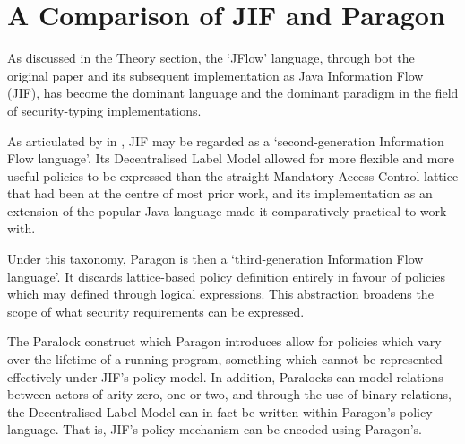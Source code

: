 \chapter{A Comparison of JIF and Paragon}

As discussed in the Theory section, the `JFlow' language, through bot the original paper \cite{myers1999jflow} and its subsequent implementation as Java Information Flow (JIF), has become the dominant language and the dominant paradigm in the field of security-typing implementations.

As articulated by \citeauthor{broberg2013paragon} in  \cite{broberg2013paragon}, JIF may be regarded as a `second-generation Information Flow language'. Its Decentralised Label Model allowed for more flexible and more useful policies to be expressed than the straight Mandatory Access Control lattice that had been at the centre of most prior work, and its implementation as an extension of the popular Java language made it comparatively practical to work with.

Under this taxonomy, Paragon is then a `third-generation Information Flow language'. It discards lattice-based policy definition entirely in favour of policies which may defined through logical expressions. This abstraction broadens the scope of what security requirements can be expressed.

The Paralock construct which Paragon introduces allow for policies which vary over the lifetime of a running program, something which cannot be represented effectively under JIF's policy model. In addition, Paralocks can model relations between actors of arity zero, one or two, and through the use of binary relations, the Decentralised Label Model can in fact be written within Paragon's policy language. That is, JIF's policy mechanism can be encoded using Paragon's.